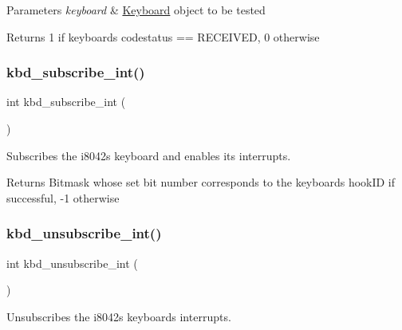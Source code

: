 \begin{DoxyParams}{Parameters}
{\em keyboard} & \hyperlink{struct_keyboard}{Keyboard} \textquotesingle{}object\textquotesingle{} to be tested \\
\hline
\end{DoxyParams}
\begin{DoxyReturn}{Returns}
1 if keyboard\textquotesingle{}s codestatus == R\+E\+C\+E\+I\+V\+ED, 0 otherwise 
\end{DoxyReturn}
\hypertarget{group__keyboard_ga77e2ed8f53e0fae3f4005fa26c6d2692}{}\label{group__keyboard_ga77e2ed8f53e0fae3f4005fa26c6d2692} 
\subsubsection{\texorpdfstring{kbd\+\_\+subscribe\+\_\+int()}{kbd\_subscribe\_int()}}
{\footnotesize\ttfamily int kbd\+\_\+subscribe\+\_\+int (\begin{DoxyParamCaption}{ }\end{DoxyParamCaption})}



Subscribes the i8042\textquotesingle{}s keyboard and enables its interrupts. 

\begin{DoxyReturn}{Returns}
Bitmask whose set bit number corresponds to the keyboard\textquotesingle{}s hook\+ID if successful, -\/1 otherwise 
\end{DoxyReturn}
\hypertarget{group__keyboard_ga5bdf6cfb570c375192b0d87913b65c57}{}\label{group__keyboard_ga5bdf6cfb570c375192b0d87913b65c57} 
\subsubsection{\texorpdfstring{kbd\+\_\+unsubscribe\+\_\+int()}{kbd\_unsubscribe\_int()}}
{\footnotesize\ttfamily int kbd\+\_\+unsubscribe\+\_\+int (\begin{DoxyParamCaption}{ }\end{DoxyParamCaption})}



Unsubscribes the i8042\textquotesingle{}s keyboard\textquotesingle{}s interrupts. 

